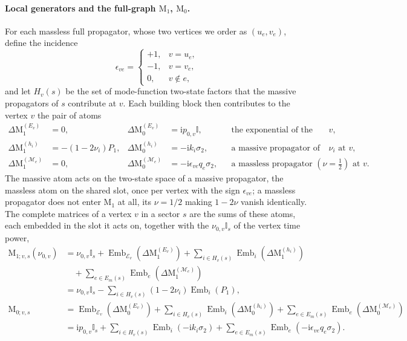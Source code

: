 \documentclass[11pt,a4paper]{article}
\numberwithin{table}{section}
\newcommand{\nn}{\nonumber}
\newcommand{\ii}{\mathrm i}
\newcommand{\Id}{\mathbb I}
\newcommand{\cE}{\mathcal E}
\newcommand{\cM}{\mathcal M}
\newcommand{\Emb}{\operatorname{Emb}}
\begin{document}
\paragraph{Local generators and the full-graph $\text{M}_1$, $\text{M}_0$.}
For each massless full propagator, whose two vertices we order as $(u_e,v_e)$, define the incidence
\begin{equation}
  \epsilon_{ve}=\begin{cases}+1,&v=u_e,\\-1,&v=v_e,\\0,&v\notin e,\end{cases}
  \label{eq:incidence}
\end{equation}
and let $H_v(s)$ be the set of mode-function two-state factors that the massive propagators of $s$ contribute at
$v$. Each building block then contributes to the vertex $v$ the pair of atoms
\begin{align}
  \Delta\text{M}_{1}^{(E_v)}&=0, & \Delta\text{M}_{0}^{(E_v)}&=\ii p_{0,v}\Id,
  &&\text{the exponential of the vertex }v,
  \label{eq:phase-block-M10}\\
  \Delta\text{M}_{1}^{(h_i)}&=-(1-2\nu_i)P_1, & \Delta\text{M}_{0}^{(h_i)}&=-\ii k_i\sigma_2,
  &&\text{a massive propagator of order }\nu_i\text{ at }v,
  \label{eq:massive-h-block-M10}\\
  \Delta\text{M}_{1}^{(\cM_e)}&=0, &
  \Delta\text{M}_{0}^{(\cM_e)}&=-\ii\epsilon_{ve}q_e\sigma_2,
  &&\text{a massless propagator }(\nu=\tfrac12)\text{ at }v.
  \label{eq:massless-shared-block-M10}
\end{align}
The massive atom acts on the two-state space of a massive propagator, the massless atom on the
shared slot, once per vertex with the sign $\epsilon_{ve}$; a massless propagator does not
enter $\text{M}_1$ at all, its $\nu=1/2$ making $1-2\nu$ vanish identically. The complete
matrices of a vertex $v$ in a sector $s$ are the sums of these atoms, each embedded in the slot
it acts on, together with the $\nu_{0,v}\Id_s$ of the vertex time power,
\begin{align}
  \text{M}_{1;v,s}(\nu_{0,v})
  &=\nu_{0,v}\Id_s+\Emb_{\cE_v}\!\left(\Delta\text{M}_{1}^{(E_v)}\right)
  +\sum_{i\in H_v(s)}\Emb_i\!\left(\Delta\text{M}_{1}^{(h_i)}\right)\nn\\
  &\quad+\sum_{e\in E_m(s)}\Emb_e\!\left(\Delta\text{M}_{1}^{(\cM_e)}\right)\nn\\
  &=\nu_{0,v}\Id_s-\sum_{i\in H_v(s)}(1-2\nu_i)\Emb_i(P_1),
  \label{eq:global-M1}\\
  \text{M}_{0;v,s}
  &=\Emb_{\cE_v}\!\left(\Delta\text{M}_{0}^{(E_v)}\right)
  +\sum_{i\in H_v(s)}\Emb_i\!\left(\Delta\text{M}_{0}^{(h_i)}\right)
  +\sum_{e\in E_m(s)}\Emb_e\!\left(\Delta\text{M}_{0}^{(\cM_e)}\right)\nn\\
  &=\ii p_{0,v}\Id_s+\sum_{i\in H_v(s)}\Emb_i(-\ii k_i\sigma_2)
  +\sum_{e\in E_m(s)}\Emb_e(-\ii\epsilon_{ve}q_e\sigma_2).
  \label{eq:global-M0}
\end{align}
\end{document}
